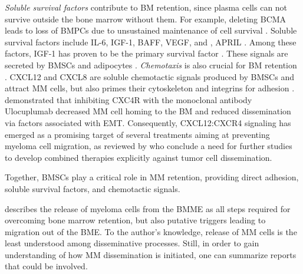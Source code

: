 \emph{Soluble survival factors} contribute to \ac{BM} retention, since plasma
cells can not survive outside the bone marrow without them. For example,
deleting BCMA  leads to loss of
\acp{BMPC}  due to unsustained maintenance of cell survival
\cite{oconnorBCMAEssentialSurvival2004}. Soluble survival factors include
\ac{IL-6}, \ac{IGF-1}, \ac{BAFF}, \ac{VEGF}, and , \ac{APRIL} . Among these factors, IGF-1 has proven to be the primary
survival factor \cite{sprynskiRoleIGF1Major2009}. These signals are secreted by
\acp{BMSC} and adipocytes \cite{kiblerAdhesiveInteractionsHuman1998,
    garcia-ortizRoleTumorMicroenvironment2021}. \emph{Chemotaxis} is also crucial
for \ac{BM} retention \cite{ullahRoleCXCR4Multiple2019}. \ac{CXCL12}
 and CXCL8 are soluble chemotactic signals
produced by \acp{BMSC} and attract \ac{MM} cells, but also primes their
cytoskeleton and integrins for adhesion
\cite{aggarwalChemokinesMultipleMyeloma2006,
    alsayedMechanismsRegulationCXCR42007}.
\citet{roccaroCXCR4RegulatesExtraMedullary2015} demonstrated that inhibiting
CXC4R  with the monoclonal antibody
Ulocuplumab decreased \ac{MM} cell homing to the \ac{BM} and reduced
dissemination via factors associated with \ac{EMT}. Consequently, CXCL12:CXCR4
signaling has emerged as a promising target of several treatments aiming at
preventing myeloma cell migration, as reviewed by
\citet{itoRoleTherapeuticTargeting2021} who conclude a need for further studies
to develop combined therapies explicitly against tumor cell dissemination.

Together, \acp{BMSC} play a critical role in \ac{MM} retention, providing direct
adhesion, soluble survival factors, and chemotactic signals.


%
\label{sec:intro_myeloma_release}%
\citet{zeissigTumourDisseminationMultiple2020} describes the release of myeloma
cells from the \ac{BMME} as all steps required for overcoming bone marrow
retention, but also putative triggers leading to migration out of the BME. To
the author's knowledge, release of \ac{MM} cells is the least understood among
disseminative processes. Still, in order to gain understanding of how \ac{MM}
dissemination is initiated, one can summarize reports that could be involved.



